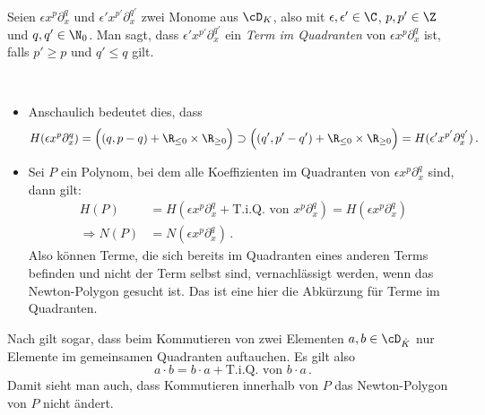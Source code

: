 \begin{defcor}
\begin{defn}
Seien $\epsilon x^{p}\partial_x^{q}$ und $\epsilon' x^{p'}\partial_x^{q'}$ zwei
Monome aus $\cD_{K}$, also mit $\epsilon, \epsilon'\in \C$, $p,p' \in \Z$ und
$q,q'\in \N_0$. Man sagt, dass $\epsilon' x^{p'}\partial_x^{q'}$ ein \emph{Term
im Quadranten} von $\epsilon x^{p}\partial_x^{q}$ ist, falls $p'\geq p$ und
$q'\leq q$ gilt.
\begin{comment}
In einem Polynom
$P=\epsilon x^{p}\partial_x^{q}
+\sum^{n}_{k=0}\big(\sum^{\infty}_{l=-N}{\alpha_{kl}x^l\big)\partial_x^k}$,
mit $\alpha_{kl}\in \C$ sind die restlichen Monome
\emph{Terme im Quadranten} von $\epsilon x^{p}\partial_x^{q}$, falls für alle
einzelnen Monome schon Terme im Quadranten von $\epsilon x^{p}\partial_x^{q}$
sind.
\end{comment}
\end{defn}
\begin{bem} ~
\begin{itemize}
\item Anschaulich bedeutet dies, dass
\[
H(\epsilon x^{p}\partial_x^{q})
=\Big( (q,p-q) + \R_{\leq 0} \times \R_{\geq 0} \Big) \supset
\Big( (q',p'-q') + \R_{\leq 0} \times \R_{\geq 0} \Big)
=H(\epsilon' x^{p'}\partial_x^{q'}) \,.
\]
\item Sei $P$ ein Polynom, bei dem alle Koeffizienten im Quadranten von
$\epsilon x^{p}\partial_x^{q}$ sind, dann gilt:
\begin{align*}
H(P)&=H(\epsilon x^{p}\partial_x^{q} + \text{T.i.Q. von }x^{p}\partial_x^{q})
=H(\epsilon x^{p}\partial_x^{q})
\\\Rightarrow N(P)&=N(\epsilon x^{p}\partial_x^{q}) \,.
\end{align*}
Also können Terme, die sich bereits im Quadranten eines anderen Terms
befinden und nicht der Term selbst sind, vernachlässigt werden, wenn das
Newton-Polygon gesucht ist. Das  ist eine hier die Abkürzung für
\glqq{}Terme im Quadranten\grqq{}.
\end{itemize}
\end{bem}
\begin{bem} \label{bem:commutateWithTiQ}
Nach \cite{sabbah_cimpa90} gilt sogar, dass beim Kommutieren von zwei
Elementen $a,b\in\cD_{\hat K}$ nur Elemente im gemeinsamen Quadranten
auftauchen. Es gilt also
\[
a\cdot b = b\cdot a +  \text{T.i.Q. von }b\cdot a \,.
\]
Damit sieht man auch, dass Kommutieren innerhalb von $P$ das Newton-Polygon von
$P$ nicht ändert.
\end{bem}
\begin{comment}
\begin{exmp}
\[
(x^a\partial_x^b)^c
=x^{ac}\partial_x^{bc}+\text{T.i.Q. von }x^{ac}\partial_x^{bc}
\]
und somit gilt
\begin{align*}
N((x^a\partial_x^b)^c)
  &=N(x^{ac}\partial_x^{bc}+\text{T.i.Q. von }x^{ac}\partial_x^{bc})
\\&=N(x^{ac}\partial_x^{bc})
\end{align*}
\end{exmp}
\end{comment}


\end{defcor}
